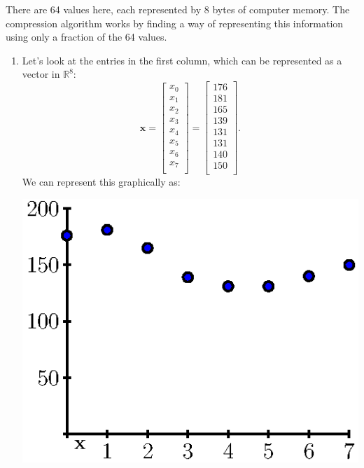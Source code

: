 \documentclass[12pt]{article}
\newcommand{\xvec}{{\mathbf x}}
\newcommand{\real}{{\mathbb R}}
\begin{document}
There are 64 values here, each represented by 8 bytes of computer
memory.  The compression algorithm works by finding a way of
representing this information using only a fraction of the 64 values. 

\bigskip
\begin{enumerate}
\item Let's look at the entries in the first column, which can be
  represented as a vector in $\real^8$:
  $$
  \xvec =
  \left[
    \begin{array}{c}
      x_0 \\ x_1 \\ x_2 \\ x_3 \\ x_4 \\ x_5 \\ x_6 \\ x_7 \\
    \end{array}
  \right] = 
  \left[
    \begin{array}{c}
      176 \\ 181 \\ 165 \\ 139 \\ 131 \\ 131 \\ 140 \\ 150 \\
    \end{array}
  \right].
  $$
  We can represent this graphically as:
  \begin{center}
    \includegraphics{jpeg-luminance-col-graph.eps}
  \end{center}


\end{enumerate}
\end{document}
